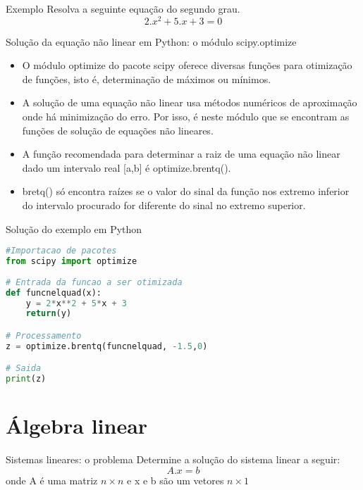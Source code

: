 \documentclass{beamer}
\begin{document}
	\begin{frame}{Exemplo}
		Resolva a seguinte equação do segundo grau.
	\begin{equation*}
	    2.x^2 + 5.x + 3 = 0
	\end{equation*}
	\end{frame}
	
	\begin{frame}{Solução da equação não linear em Python: o módulo scipy.optimize}
		\begin{itemize}
			\item O módulo optimize do pacote scipy oferece diversas funções para otimização de funções, isto é, determinação de máximos ou mínimos.
			\item A solução de uma equação não linear usa métodos numéricos de aproximação onde há minimização do erro. Por isso, é neste módulo que se encontram as funções de solução de equações não lineares.
			\item A função recomendada para determinar a raiz de uma equação não linear dado um intervalo real [a,b] é optimize.brentq().
			\item bretq() só encontra raízes se o valor do sinal da função nos extremo inferior do intervalo procurado for diferente do sinal no extremo superior.
		\end{itemize} 
	\end{frame}
	
\begin{frame}[fragile]{Solução do exemplo em Python}
		
\begin{lstlisting}[language=Python]
#Importacao de pacotes
from scipy import optimize
		
# Entrada da funcao a ser otimizada
def funcnelquad(x):
	y = 2*x**2 + 5*x + 3
	return(y)

# Processamento
z = optimize.brentq(funcnelquad, -1.5,0)

# Saida
print(z)
\end{lstlisting}
\end{frame}

\section{Álgebra linear}
	

	\begin{frame}{Sistemas lineares: o problema}
		Determine a solução do sistema linear a seguir: 
		\begin{equation}
		A.x = b
		\end{equation}
		onde A é uma matriz \( n \times n \) e x e b são um vetores \(n \times 1 \) 
		
	\end{frame}
	
\end{document}
